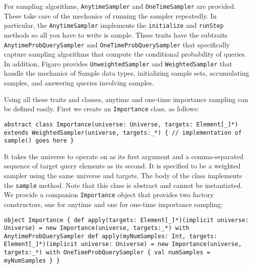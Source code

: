 For sampling algorithms, \texttt{AnytimeSampler} and \texttt{OneTimeSampler} are provided. These take care of the mechanics of running the sampler repeatedly. In particular, the \texttt{AnytimeSampler} implements the \texttt{initialize} and \texttt{runStep} methods so all you have to write is sample. These traits have the subtraits \texttt{AnytimeProbQuerySampler} and \texttt{OneTimeProbQuery\-Sampler} that specifically capture sampling algorithms that compute the conditional probability of queries. In addition, Figaro provides \texttt{Unweighted\-Sampler} and \texttt{WeightedSampler} that handle the mechanics of Sample data types, initializing sample sets, accumulating samples, and answering queries involving samples.

Using all these traits and classes, anytime and one-time importance sampling can be defined easily. First we create an \texttt{Importance} class, as follows:

\begin{flushleft}
\texttt{abstract class Importance(universe: Universe, targets: Element[\_]*) \newline extends WeightedSampler(universe, targets:\_*) \{
\newline // implementation of sample() goes here
\newline \}
}
\end{flushleft}


It takes the universe to operate on as its first argument and a comma-separated sequence of target query elements as its second. It is specified to be a weighted sampler using the same universe and targets. The body of the class implements the \texttt{sample} method. Note that this class is abstract and cannot be instantiated. We provide a companion \texttt{Importance} object that provides two factory constructors, one for anytime and one for one-time importance sampling:

\begin{flushleft}
\texttt{object Importance \{
\newline \tab def apply(targets: Element[\_]*)(implicit universe: Universe) =
\newline \tab new Importance(universe, targets:\_*)
\newline \tab with AnytimeProbQuerySampler
\newline 
\newline \tab def apply(myNumSamples: Int, targets: Element[\_]*)(implicit universe: Universe) = new Importance(universe, targets:\_*) 
\newline \tab with OneTimeProbQuerySampler \{ val numSamples = myNumSamples \}
\newline \}
}
\end{flushleft}

